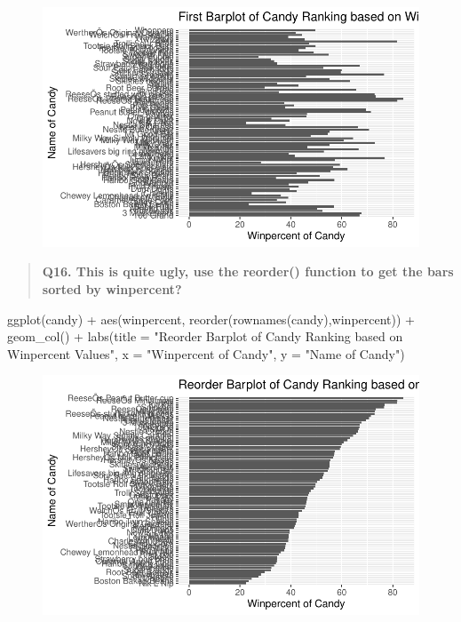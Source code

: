 \documentclass[
  letterpaper,
  DIV=11,
  numbers=noendperiod]{scrartcl}
\newenvironment{Shaded}{\begin{snugshade}}{\end{snugshade}}
\newcommand{\AttributeTok}[1]{\textcolor[rgb]{0.40,0.45,0.13}{#1}}
\newcommand{\FunctionTok}[1]{\textcolor[rgb]{0.28,0.35,0.67}{#1}}
\newcommand{\NormalTok}[1]{\textcolor[rgb]{0.00,0.23,0.31}{#1}}
\newcommand{\SpecialCharTok}[1]{\textcolor[rgb]{0.37,0.37,0.37}{#1}}
\newcommand{\StringTok}[1]{\textcolor[rgb]{0.13,0.47,0.30}{#1}}
\begin{document}
\begin{figure}[H]

{\centering \includegraphics{class10_files/figure-pdf/unnamed-chunk-17-1.pdf}

}

\end{figure}

\begin{quote}
\textbf{Q16. This is quite ugly, use the reorder() function to get the
bars sorted by winpercent?}
\end{quote}

\begin{Shaded}
\begin{Highlighting}[]
\FunctionTok{ggplot}\NormalTok{(candy) }\SpecialCharTok{+} 
  \FunctionTok{aes}\NormalTok{(winpercent, }\FunctionTok{reorder}\NormalTok{(}\FunctionTok{rownames}\NormalTok{(candy),winpercent)) }\SpecialCharTok{+}
  \FunctionTok{geom\_col}\NormalTok{() }\SpecialCharTok{+}
  \FunctionTok{labs}\NormalTok{(}\AttributeTok{title =} \StringTok{"Reorder Barplot of Candy Ranking based on Winpercent Values"}\NormalTok{, }
       \AttributeTok{x =} \StringTok{"Winpercent of Candy"}\NormalTok{, }\AttributeTok{y =} \StringTok{"Name of Candy"}\NormalTok{)}
\end{Highlighting}
\end{Shaded}

\begin{figure}[H]

{\centering \includegraphics{class10_files/figure-pdf/unnamed-chunk-18-1.pdf}

}

\end{figure}
\end{document}
